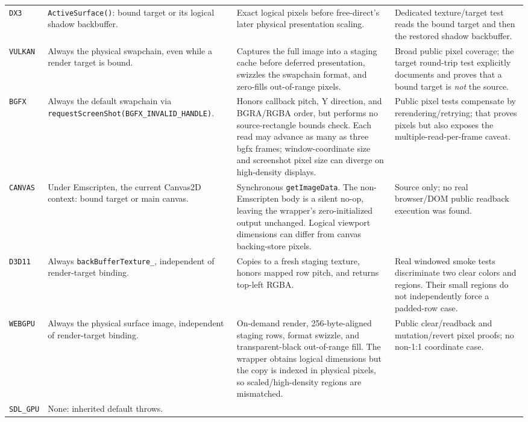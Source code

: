 \begin{longtable}{@{}p{}p{}p{}p{}@{}}
\texttt{DX3}
  & \texttt{ActiveSurface()}: bound target or its logical shadow backbuffer.
  & Exact logical pixels before free-direct's later physical presentation scaling.
  & Dedicated texture/target test reads the bound target and then the restored shadow
    backbuffer. \\
\texttt{VULKAN}
  & Always the physical swapchain, even while a render target is bound.
  & Captures the full image into a staging cache before deferred presentation, swizzles the
    swapchain format, and zero-fills out-of-range pixels.
  & Broad public pixel coverage; the target round-trip test explicitly documents and proves
    that a bound target is \emph{not} the source. \\
\texttt{BGFX}
  & Always the default swapchain via
    \texttt{requestScreenShot(\allowbreak BGFX\_INVALID\_HANDLE)}.
  & Honors callback pitch, Y direction, and BGRA/RGBA order, but performs no source-rectangle
    bounds check. Each read may advance as many as three bgfx frames; window-coordinate size
    and screenshot pixel size can diverge on high-density displays.
  & Public pixel tests compensate by rerendering/retrying; that proves pixels but also exposes
    the multiple-read-per-frame caveat. \\
\texttt{CANVAS}
  & Under Emscripten, the current Canvas2D context: bound target or main canvas.
  & Synchronous \texttt{getImageData}. The non-Emscripten body is a silent no-op, leaving the
    wrapper's zero-initialized output unchanged. Logical viewport dimensions can differ from
    canvas backing-store pixels.
  & Source only; no real browser/DOM public readback execution was found. \\
\texttt{D3D11}
  & Always \texttt{backBufferTexture\_}, independent of render-target binding.
  & Copies to a fresh staging texture, honors mapped row pitch, and returns top-left RGBA.
  & Real windowed smoke tests discriminate two clear colors and regions. Their small regions
    do not independently force a padded-row case. \\
\texttt{WEBGPU}
  & Always the physical surface image, independent of render-target binding.
  & On-demand render, 256-byte-aligned staging rows, format swizzle, and transparent-black
    out-of-range fill. The wrapper obtains logical dimensions but the copy is indexed in
    physical pixels, so scaled/high-density regions are mismatched.
  & Public clear/readback and mutation/revert pixel proofs; no non-1:1 coordinate case. \\
\texttt{SDL\_GPU}
  & None: inherited default throws.

\end{longtable}
